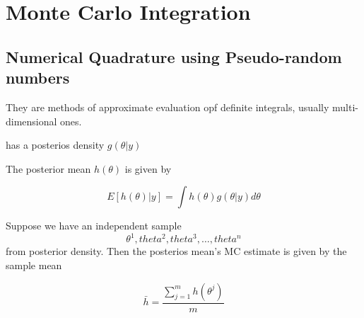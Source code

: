 \section*{Monte Carlo Integration}

\subsection{Numerical Quadrature using Pseudo-random numbers}
They are methods of approximate evaluation opf definite integrals, usually multi-dimensional ones.

\theta has a posterios density $g(\theta |y)$

The posterior mean $h(\theta)$ is given by

\[E[h(\theta)|y]  = \int h(\theta) g(\theta|y) d \theta\]

Suppose we have an independent sample 
\[ \theta^{1}, theta^{2}, theta^{3}, \ldots, theta^{n}\]
from posterior density. Then the posterios mean's MC estimate is given by the sample mean

\[ \bar{h}  = \frac{\sum^{m}_{j=1} h(\theta^j) }{m} \]


